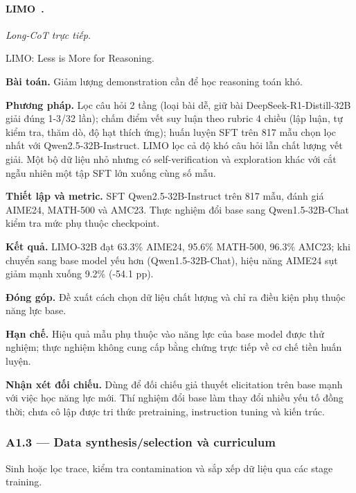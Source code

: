 \begin{samepage}
\paragraph{LIMO~\cite{rra1_limo}.}
\emph{Long-CoT trực tiếp.}\par
{\raggedright\noindent\small LIMO: Less is More for Reasoning.\par}
\noindent\textbf{Bài toán.} Giảm lượng demonstration cần để học reasoning toán khó.\par
\end{samepage}
\noindent\textbf{Phương pháp.} Lọc câu hỏi 2 tầng (loại bài dễ, giữ bài DeepSeek-R1-Distill-32B giải đúng 1-3/32 lần); chấm điểm vết suy luận theo rubric 4 chiều (lập luận, tự kiểm tra, thăm dò, độ hạt thích ứng); huấn luyện SFT trên 817 mẫu chọn lọc nhất với Qwen2.5-32B-Instruct. LIMO lọc cả độ khó câu hỏi lẫn chất lượng vết giải. Một bộ dữ liệu nhỏ nhưng có self-verification và exploration khác với cắt ngẫu nhiên một tập SFT lớn xuống cùng số mẫu.\par
\noindent\textbf{Thiết lập và metric.} SFT Qwen2.5-32B-Instruct trên 817 mẫu, đánh giá AIME24, MATH-500 và AMC23. Thực nghiệm đổi base sang Qwen1.5-32B-Chat kiểm tra mức phụ thuộc checkpoint.\par
\noindent\textbf{Kết quả.} LIMO-32B đạt 63.3\% AIME24, 95.6\% MATH-500, 96.3\% AMC23; khi chuyển sang base model yếu hơn (Qwen1.5-32B-Chat), hiệu năng AIME24 sụt giảm mạnh xuống 9.2\% (-54.1 pp).\par
\noindent\textbf{Đóng góp.} Đề xuất cách chọn dữ liệu chất lượng và chỉ ra điều kiện phụ thuộc năng lực base.\par
\noindent\textbf{Hạn chế.} Hiệu quả mẫu phụ thuộc vào năng lực của base model được thử nghiệm; thực nghiệm không cung cấp bằng chứng trực tiếp về cơ chế tiền huấn luyện.\par
\begin{samepage}
\noindent\textbf{Nhận xét đối chiếu.} Dùng để đối chiếu giả thuyết elicitation trên base mạnh với việc học năng lực mới. Thí nghiệm đổi base làm thay đổi nhiều yếu tố đồng thời; chưa cô lập được tri thức pretraining, instruction tuning và kiến trúc.\par
{}
\end{samepage}

\subsubsection*{A1.3 — Data synthesis/selection và curriculum}
Sinh hoặc lọc trace, kiểm tra contamination và sắp xếp dữ liệu qua các stage training.


